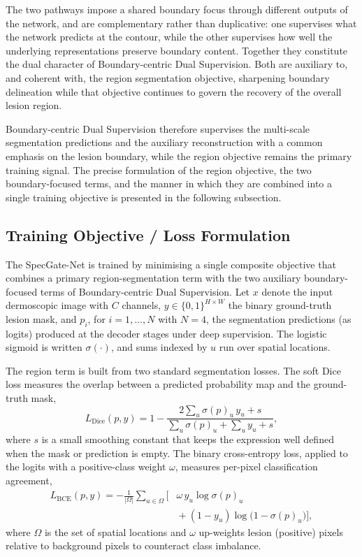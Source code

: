 The two pathways impose a shared boundary focus through different outputs of the network, and are complementary rather than duplicative: one supervises what the network predicts at the contour, while the other supervises how well the underlying representations preserve boundary content. Together they constitute the dual character of Boundary-centric Dual Supervision. Both are auxiliary to, and coherent with, the region segmentation objective, sharpening boundary delineation while that objective continues to govern the recovery of the overall lesion region.

Boundary-centric Dual Supervision therefore supervises the multi-scale segmentation predictions and the auxiliary reconstruction with a common emphasis on the lesion boundary, while the region objective remains the primary training signal. The precise formulation of the region objective, the two boundary-focused terms, and the manner in which they are combined into a single training objective is presented in the following subsection.

\subsection{Training Objective / Loss Formulation}
\label{subsec:loss}

The SpecGate-Net is trained by minimising a single composite objective that combines a primary region-segmentation term with the two auxiliary boundary-focused terms of Boundary-centric Dual Supervision. Let $x$ denote the input dermoscopic image with $C$ channels, $y \in \{0,1\}^{H \times W}$ the binary ground-truth lesion mask, and $p_i$, for $i = 1,\dots,N$ with $N = 4$, the segmentation predictions (as logits) produced at the decoder stages under deep supervision. The logistic sigmoid is written $\sigma(\cdot)$, and sums indexed by $u$ run over spatial locations.

The region term is built from two standard segmentation losses. The soft Dice loss measures the overlap between a predicted probability map and the ground-truth mask,
\begin{equation}
L_{\mathrm{Dice}}(p,y) = 1 - \frac{2\sum_{u}\sigma(p)_u\,y_u + s}{\sum_{u}\sigma(p)_u + \sum_{u}y_u + s}, \tag{1}
\label{eq:1}
\end{equation}
where $s$ is a small smoothing constant that keeps the expression well defined when the mask or prediction is empty. The binary cross-entropy loss, applied to the logits with a positive-class weight $\omega$, measures per-pixel classification agreement,
\begin{equation}
\begin{split}
L_{\mathrm{BCE}}(p,y) = -\frac{1}{|\Omega|}\sum_{u \in \Omega}\Big[ & \omega\,y_u\log\sigma(p)_u \\
& {}+ (1-y_u)\log\big(1-\sigma(p)_u\big)\Big],
\end{split} \tag{2}
\label{eq:2}
\end{equation}
where $\Omega$ is the set of spatial locations and $\omega$ up-weights lesion (positive) pixels relative to background pixels to counteract class imbalance.

